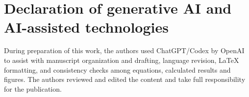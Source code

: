 \section*{Declaration of generative AI and AI-assisted technologies}
During preparation of this work, the authors used ChatGPT/Codex by OpenAI to assist with manuscript organization and drafting, language revision, LaTeX formatting, and consistency checks among equations, calculated results and figures.
The authors reviewed and edited the content and take full responsibility for the publication.
